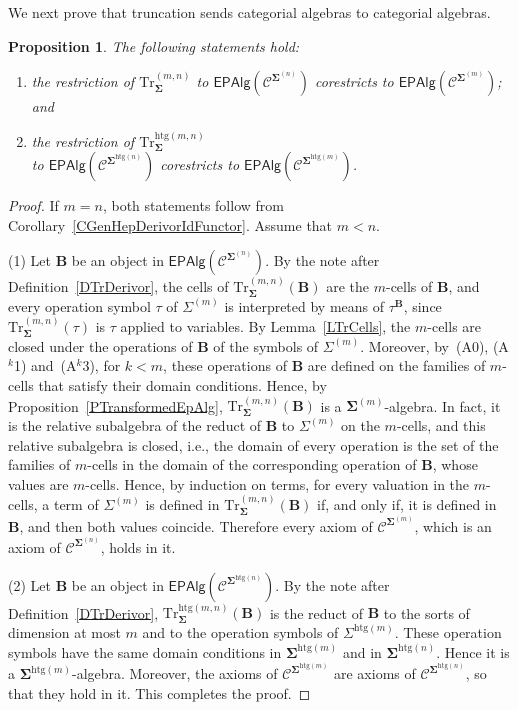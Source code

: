 \documentclass[a4paper, reqno]{amsbook}
\newcommand{\sig}[1]{\mathbf{#1}}             %
\newcommand{\spec}[1]{\boldsymbol{\mathcal{#1}}} %
\newcommand{\htg}{\mathrm{htg}}                %
\newcommand{\Tr}{\mathrm{Tr}}
\theoremstyle{plain}
\newtheorem{proposition}[theorem]{Proposition}
\theoremstyle{definition}
\begin{document}
We next prove that truncation sends categorial algebras to categorial algebras.

\begin{proposition}\label{PTrEpVariety}
The following statements hold:
\begin{enumerate}
\item the restriction of $\Tr^{(m,n)}_{\sig{\Sigma}}$ to $\mathsf{EPAlg}(\spec{C}^{\sig{\Sigma}^{(n)}})$ corestricts to $\mathsf{EPAlg}(\spec{C}^{\sig{\Sigma}^{(m)}})$; and
\item the restriction of $\Tr^{\htg(m,n)}_{\sig{\Sigma}}$\\ to $\mathsf{EPAlg}(\spec{C}^{\sig{\Sigma}^{\htg(n)}})$ corestricts to $\mathsf{EPAlg}(\spec{C}^{\sig{\Sigma}^{\htg(m)}})$.
\end{enumerate}
\end{proposition}
\begin{proof}
If $m=n$, both statements follow from Corollary~\ref{CGenHepDerivorIdFunctor}.
Assume that $m<n$.

(1) Let $\mathbf{B}$ be an object in $\mathsf{EPAlg}(\spec{C}^{\sig{\Sigma}^{(n)}})$.
By the note after Definition~\ref{DTrDerivor}, the cells of $\Tr^{(m,n)}_{\sig{\Sigma}}(\mathbf{B})$ are the $m$-cells of $\mathbf{B}$, and every operation symbol $\tau$ of $\Sigma^{(m)}$ is interpreted by means of $\tau^{\mathbf{B}}$, since $\Tr^{(m,n)}_{\sig{\Sigma}}(\tau)$ is $\tau$ applied to variables.
By Lemma~\ref{LTrCells}, the $m$-cells are closed under the operations of $\mathbf{B}$ of the symbols of $\Sigma^{(m)}$.
Moreover, by~(A0), (A$^{k}$1) and~(A$^{k}$3), for $k<m$, these operations of $\mathbf{B}$ are defined on the families of $m$-cells that satisfy their domain conditions.
Hence, by Proposition~\ref{PTransformedEpAlg}, $\Tr^{(m,n)}_{\sig{\Sigma}}(\mathbf{B})$ is a $\sig{\Sigma}^{(m)}$-algebra.
In fact, it is the relative subalgebra of the reduct of $\mathbf{B}$ to $\Sigma^{(m)}$ on the $m$-cells, and this relative subalgebra is closed, i.e., the domain of every operation is the set of the families of $m$-cells in the domain of the corresponding operation of $\mathbf{B}$, whose values are $m$-cells.
Hence, by induction on terms, for every valuation in the $m$-cells, a term of $\Sigma^{(m)}$ is defined in $\Tr^{(m,n)}_{\sig{\Sigma}}(\mathbf{B})$ if, and only if, it is defined in $\mathbf{B}$, and then both values coincide.
Therefore every axiom of $\spec{C}^{\sig{\Sigma}^{(m)}}$, which is an axiom of $\spec{C}^{\sig{\Sigma}^{(n)}}$, holds in it.

(2) Let $\mathbf{B}$ be an object in $\mathsf{EPAlg}(\spec{C}^{\sig{\Sigma}^{\htg(n)}})$.
By the note after Definition~\ref{DTrDerivor}, $\Tr^{\htg(m,n)}_{\sig{\Sigma}}(\mathbf{B})$ is the reduct of $\mathbf{B}$ to the sorts of dimension at most $m$ and to the operation symbols of $\Sigma^{\htg(m)}$.
These operation symbols have the same domain conditions in $\sig{\Sigma}^{\htg(m)}$ and in $\sig{\Sigma}^{\htg(n)}$.
Hence it is a $\sig{\Sigma}^{\htg(m)}$-algebra.
Moreover, the axioms of $\spec{C}^{\sig{\Sigma}^{\htg(m)}}$ are axioms of $\spec{C}^{\sig{\Sigma}^{\htg(n)}}$, so that they hold in it. This completes the proof.
\end{proof}
\end{document}
